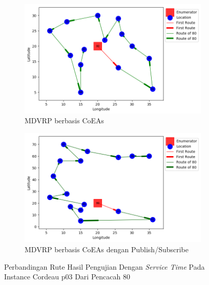 \begin{figure}[H]
	\centering
	\begin{subfigure}[t]{\textwidth}
		\centering
		\includegraphics[width=\textwidth]{Resources/Images/cordeau_p03_tw/cordeau_p03_tw_80_coes}
		\caption{MDVRP berbasis CoEAs}
		\label{fig:cordeau_p03_tw_80_coes}
	\end{subfigure}
	\begin{subfigure}[t]{\textwidth}
		\centering
		\includegraphics[width=\textwidth]{Resources/Images/cordeau_p03_tw/cordeau_p03_tw_80_pubsub_coes}
		\caption{MDVRP berbasis CoEAs dengan Publish/Subscribe}
		\label{fig:cordeau_p03_tw_80_pubsub_coes}
	\end{subfigure}
	\caption{Perbandingan Rute Hasil Pengujian Dengan \textit{Service Time} Pada Instance Cordeau p03 Dari Pencacah 80}
	\label{fig:cordeau_p03_tw_80}
\end{figure}


